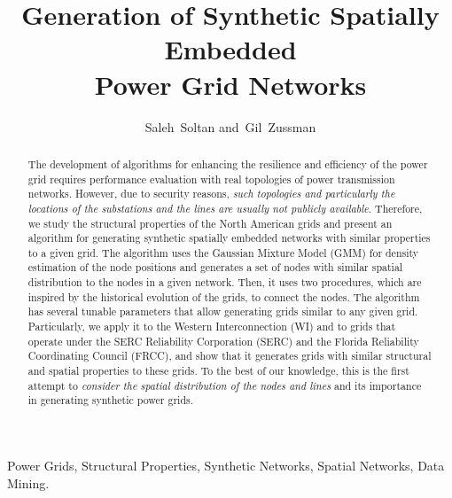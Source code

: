 \documentclass[10pt,journal]{IEEEtran}
\begin{document}
\title{Generation of Synthetic Spatially Embedded \\Power Grid Networks}

\author{Saleh~Soltan
        and~Gil~Zussman}


\maketitle
\begin{abstract}

The development of algorithms for enhancing the resilience and efficiency of the power grid requires performance evaluation with real topologies of power transmission networks. However, due to security reasons, \emph{such topologies and particularly the locations of the substations and the lines are usually not publicly available}. Therefore, we study the structural properties of the North American grids and present an algorithm for generating synthetic spatially embedded networks with similar properties to a given grid. The algorithm uses the Gaussian Mixture Model (GMM) for density estimation of the node positions and generates a set of nodes with similar spatial distribution to the nodes in a given network. Then, it uses two procedures, which are inspired by the historical evolution of the grids, to connect the nodes. The algorithm has several tunable parameters that allow generating grids similar to any given grid. Particularly, we apply it to the Western Interconnection (WI) and to grids that operate under the SERC Reliability Corporation (SERC) and the Florida Reliability Coordinating Council (FRCC), and show that it generates grids with similar structural and spatial properties to these grids. To the best of our knowledge, this is the first attempt to \emph{consider the spatial distribution of the nodes and lines} and its importance in generating synthetic power grids.
\end{abstract}


\begin{IEEEkeywords}
Power Grids, Structural Properties, Synthetic Networks, Spatial Networks, Data Mining.
\end{IEEEkeywords}


\setlength{\textfloatsep}{4 pt}
\end{document}
